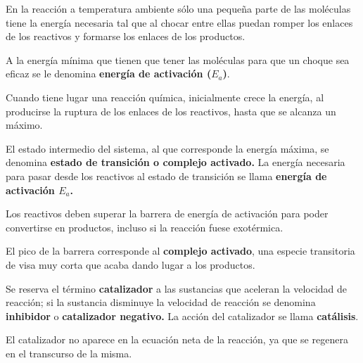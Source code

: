 \documentclass[
  spanish,
]{article}
\begin{document}
En la reacción  a temperatura ambiente
sólo una pequeña parte de las moléculas tiene la energía necesaria tal
que al chocar entre ellas puedan romper los enlaces de los reactivos y
formarse los enlaces de los productos.

A la energía mínima que tienen que tener las moléculas para que un
choque sea eficaz se le denomina \textbf{energía de activación
(\(E_a\))}.

Cuando tiene lugar una reacción química, inicialmente crece la energía,
al producirse la ruptura de los enlaces de los reactivos, hasta que se
alcanza un máximo.

El estado intermedio del sistema, al que corresponde la energía máxima,
se denomina \textbf{estado de transición o complejo activado.} La
energía necesaria para pasar desde los reactivos al estado de transición
se llama \textbf{energía de activación \(E_a\).}

Los reactivos deben superar la barrera de energía de activación para
poder convertirse en productos, incluso si la reacción fuese exotérmica.

El pico de la barrera corresponde al \textbf{complejo activado}, una
especie transitoria de visa muy corta que acaba dando lugar a los
productos.

Se reserva el término \textbf{catalizador} a las sustancias que aceleran
la velocidad de reacción; si la sustancia disminuye la velocidad de
reacción se denomina \textbf{inhibidor} o \textbf{catalizador negativo.}
La acción del catalizador se llama \textbf{catálisis}.

El catalizador no aparece en la ecuación neta de la reacción, ya que se
regenera en el transcurso de la misma.

\hfill{}
\end{document}
